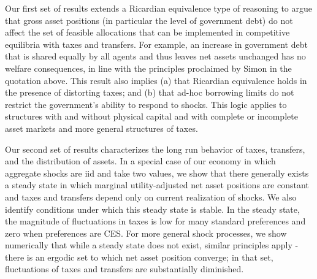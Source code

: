 \documentclass[thmsb,11pt]{article}
\begin{document}
Our first set of results extends a Ricardian equivalence type of reasoning to argue that gross asset positions (in particular the level of government debt) do not affect the set of feasible allocations that can be implemented in competitive equilibria with taxes and transfers. For example, an increase in government debt that is shared equally by all agents and thus leaves net assets unchanged  has no welfare consequences, in line with the principles proclaimed by Simon \citet{newcomb1865critical} %
 in the quotation above. This result also implies (a) that Ricardian
equivalence holds in the presence of
distorting  taxes; and (b) that ad-hoc borrowing limits do not restrict the government's ability to respond to shocks.
This logic applies to structures with and without physical
capital and with complete or incomplete asset markets and more general structures of taxes.



Our second set of results characterizes the long run behavior of taxes, transfers, and the distribution of assets. In a special case of our economy in which aggregate shocks are iid and take two values, we show that  there generally exists a steady state in which marginal utility-adjusted net asset positions are constant and taxes and transfers depend only on current realization of shocks. We also identify conditions under which this steady state is stable. In the steady state, the magnitude of fluctuations in taxes is low for many standard preferences and zero when preferences are CES. For more general shock processes, we show numerically that while a steady state does not exist, similar principles apply - there is an ergodic set to which net asset position converge; in that set, fluctuations of taxes and transfers are substantially diminished.
\end{document}
